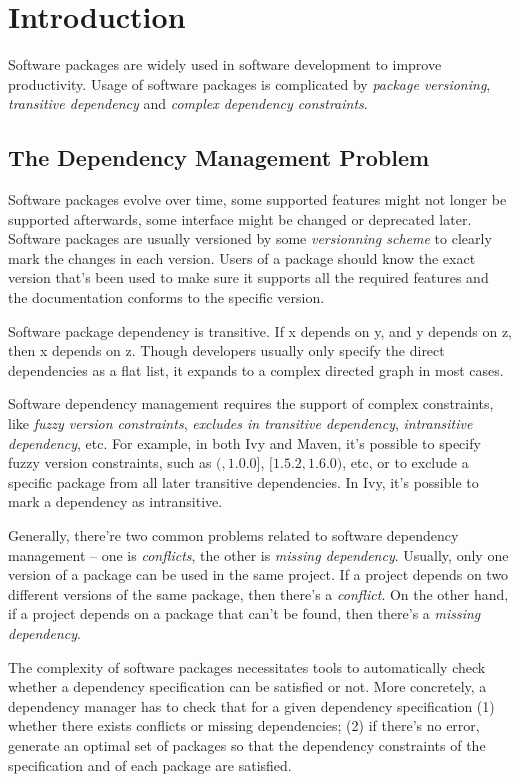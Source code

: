 \section{Introduction}

Software packages are widely used in software development to improve productivity. Usage of software packages is complicated by \emph{package versioning}, \emph{transitive dependency} and \emph{complex dependency constraints}.


\subsection{The Dependency Management Problem}

Software packages evolve over time, some supported features might not longer be supported afterwards, some interface might be changed or deprecated later. Software packages are usually versioned by some \emph{versionning scheme} to clearly mark the changes in each version. Users of a package should know the exact version that's been used to make sure it supports all the required features and the documentation conforms to the specific version.

Software package dependency is transitive. If x depends on y, and y depends on z, then x depends on z. Though developers usually only specify the direct dependencies as a flat list, it expands to a complex directed graph in most cases.

Software dependency management requires the support of complex constraints, like \emph{fuzzy version constraints}, \emph{excludes in transitive dependency}, \emph{intransitive dependency}, etc. For example, in both Ivy and Maven, it's possible to specify fuzzy version constraints, such as $(, 1.0.0]$, $[1.5.2, 1.6.0)$, etc, or to exclude a specific package from all later transitive dependencies. In Ivy, it's possible to mark a dependency as intransitive.

Generally, there're two common problems related to software dependency management -- one is \emph{conflicts}, the other is \emph{missing dependency}. Usually, only one version of a package can be used in the same project. If a project depends on two different versions of the same package, then there's a \emph{conflict}. On the other hand, if a project depends on a package that can't be found, then there's a \emph{missing dependency}.

The complexity of software packages necessitates tools to automatically check whether a dependency specification can be satisfied or not. More concretely, a dependency manager has to check that for a given dependency specification (1) whether there exists conflicts or missing dependencies; (2) if there's no error, generate an optimal set of packages so that the dependency constraints of the specification and of each package are satisfied.


